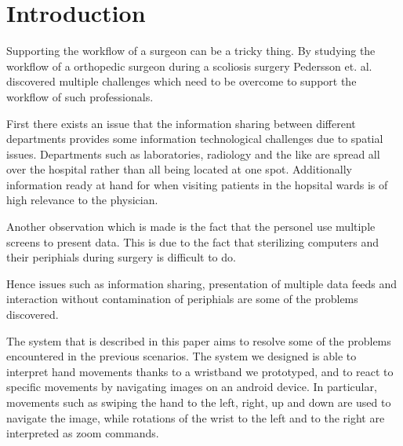 \section{Introduction}
Supporting the workflow of a surgeon can be a tricky thing.
By studying the workflow of a orthopedic surgeon during a scoliosis surgery Pedersson et. al.\cite{Pederson:2015} discovered multiple challenges which need to be overcome to support the workflow of such professionals.

First there exists an issue that the information sharing between different departments provides some information technological  challenges due to spatial issues.
Departments such as laboratories, radiology and the like are spread all over the hospital rather than all being located at one spot.
Additionally information ready at hand for when visiting patients in the hopsital wards is of high relevance to the physician. 

Another observation which is made is the fact that the personel use multiple screens to present data.
This is due to the fact that sterilizing computers and their periphials during surgery is difficult to do.

Hence issues such as information sharing, presentation of multiple data feeds and interaction without contamination of periphials are some of the problems discovered.










The system that is described in this paper aims to resolve some of the problems encountered in the previous scenarios.
The system we designed is able to interpret hand movements thanks to a wristband we prototyped, and to react to specific movements by navigating images on an android device.
In particular, movements such as swiping the hand to the left, right, up and down are used to navigate the image,
while rotations of the wrist to the left and to the right are interpreted as zoom commands.
